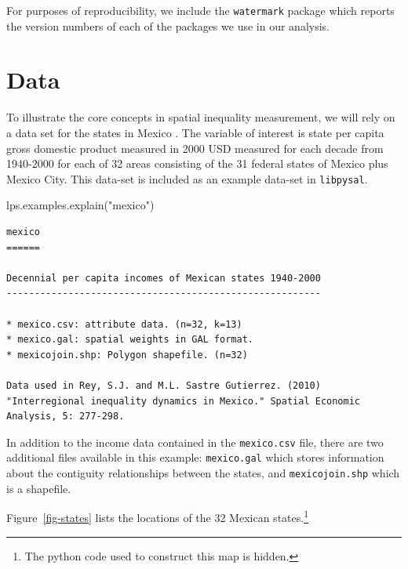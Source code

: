 \documentclass[
  a4paper, 
  twoside,
  final
]{article}
\newenvironment{Shaded}{\begin{snugshade}}{\end{snugshade}}
\newcommand{\NormalTok}[1]{\textcolor[rgb]{0.00,0.23,0.31}{#1}}
\newcommand{\StringTok}[1]{\textcolor[rgb]{0.13,0.47,0.30}{#1}}
\newcounter{code}
\begin{document}
For purposes of reproducibility, we include the \texttt{watermark}
package which reports the version numbers of each of the packages we use
in our analysis.

\section{Data}\label{data}

To illustrate the core concepts in spatial inequality measurement, we
will rely on a data set for the states in Mexico
\citep{rey2010InterregionalInequality}. The variable of interest is
state per capita gross domestic product measured in 2000 USD measured
for each decade from 1940-2000 for each of 32 areas consisting of the 31
federal states of Mexico plus Mexico City. This data-set is included as
an example data-set in \texttt{libpysal}.

\begin{Shaded}
\begin{Highlighting}[]
\NormalTok{lps.examples.explain(}\StringTok{"mexico"}\NormalTok{)}
\end{Highlighting}
\end{Shaded}

\begin{verbatim}
mexico
======

Decennial per capita incomes of Mexican states 1940-2000
--------------------------------------------------------

* mexico.csv: attribute data. (n=32, k=13)
* mexico.gal: spatial weights in GAL format.
* mexicojoin.shp: Polygon shapefile. (n=32)

Data used in Rey, S.J. and M.L. Sastre Gutierrez. (2010) "Interregional inequality dynamics in Mexico." Spatial Economic Analysis, 5: 277-298.
\end{verbatim}

In addition to the income data contained in the \texttt{mexico.csv}
file, there are two additional files available in this example:
\texttt{mexico.gal} which stores information about the contiguity
relationships between the states, and \texttt{mexicojoin.shp} which is a
shapefile.

Figure~\ref{fig-states} lists the locations of the 32 Mexican
states.\footnote{The python code used to construct this map is hidden.}
\end{document}
